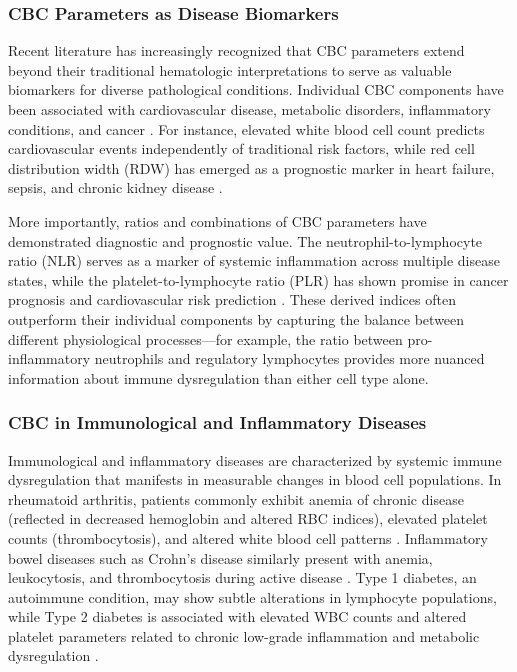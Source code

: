 \documentclass[12pt,a4paper]{article}
\begin{document}
\subsubsection{CBC Parameters as Disease Biomarkers}

Recent literature has increasingly recognized that CBC parameters extend beyond their traditional hematologic interpretations to serve as valuable biomarkers for diverse pathological conditions. Individual CBC components have been associated with cardiovascular disease, metabolic disorders, inflammatory conditions, and cancer \cite{ref10}. For instance, elevated white blood cell count predicts cardiovascular events independently of traditional risk factors, while red cell distribution width (RDW) has emerged as a prognostic marker in heart failure, sepsis, and chronic kidney disease \cite{ref10}.

More importantly, ratios and combinations of CBC parameters have demonstrated diagnostic and prognostic value. The neutrophil-to-lymphocyte ratio (NLR) serves as a marker of systemic inflammation across multiple disease states, while the platelet-to-lymphocyte ratio (PLR) has shown promise in cancer prognosis and cardiovascular risk prediction \cite{ref7,ref8,ref10}. These derived indices often outperform their individual components by capturing the balance between different physiological processes---for example, the ratio between pro-inflammatory neutrophils and regulatory lymphocytes provides more nuanced information about immune dysregulation than either cell type alone.

\subsubsection{CBC in Immunological and Inflammatory Diseases}

Immunological and inflammatory diseases are characterized by systemic immune dysregulation that manifests in measurable changes in blood cell populations. In rheumatoid arthritis, patients commonly exhibit anemia of chronic disease (reflected in decreased hemoglobin and altered RBC indices), elevated platelet counts (thrombocytosis), and altered white blood cell patterns \cite{ref14,ref15}. Inflammatory bowel diseases such as Crohn's disease similarly present with anemia, leukocytosis, and thrombocytosis during active disease \cite{ref16}. Type 1 diabetes, an autoimmune condition, may show subtle alterations in lymphocyte populations, while Type 2 diabetes is associated with elevated WBC counts and altered platelet parameters related to chronic low-grade inflammation and metabolic dysregulation \cite{ref10}.
\end{document}
